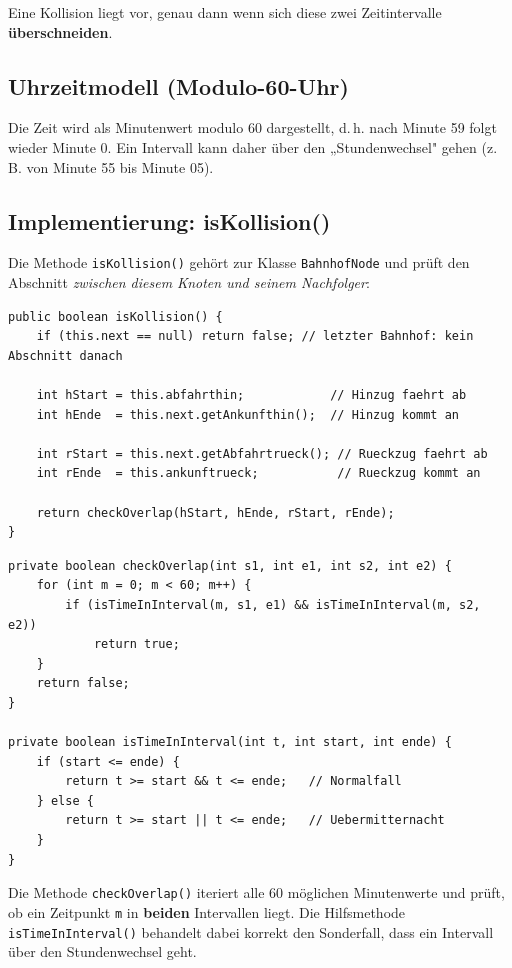 \documentclass[12pt,a4paper]{article}
\begin{document}
Eine Kollision liegt vor, genau dann wenn sich diese zwei Zeitintervalle \textbf{überschneiden}.

\subsection{Uhrzeitmodell (Modulo-60-Uhr)}

Die Zeit wird als Minutenwert modulo 60 dargestellt, d.\,h. nach Minute 59 folgt wieder Minute 0. Ein Intervall kann daher über den „Stundenwechsel" gehen (z.\,B. von Minute 55 bis Minute 05).

\subsection{Implementierung: isKollision()}

Die Methode \texttt{isKollision()} gehört zur Klasse \texttt{BahnhofNode} und prüft den Abschnitt \emph{zwischen diesem Knoten und seinem Nachfolger}:

\begin{lstlisting}[caption={BahnhofNode.isKollision()}]
public boolean isKollision() {
    if (this.next == null) return false; // letzter Bahnhof: kein Abschnitt danach

    int hStart = this.abfahrthin;            // Hinzug faehrt ab
    int hEnde  = this.next.getAnkunfthin();  // Hinzug kommt an

    int rStart = this.next.getAbfahrtrueck(); // Rueckzug faehrt ab
    int rEnde  = this.ankunftrueck;           // Rueckzug kommt an

    return checkOverlap(hStart, hEnde, rStart, rEnde);
}
\end{lstlisting}

\begin{lstlisting}[caption={Intervall-Überschneidungsprüfung}]
private boolean checkOverlap(int s1, int e1, int s2, int e2) {
    for (int m = 0; m < 60; m++) {
        if (isTimeInInterval(m, s1, e1) && isTimeInInterval(m, s2, e2))
            return true;
    }
    return false;
}

private boolean isTimeInInterval(int t, int start, int ende) {
    if (start <= ende) {
        return t >= start && t <= ende;   // Normalfall
    } else {
        return t >= start || t <= ende;   // Uebermitternacht
    }
}
\end{lstlisting}

Die Methode \texttt{checkOverlap()} iteriert alle 60 möglichen Minutenwerte und prüft, ob ein Zeitpunkt \texttt{m} in \textbf{beiden} Intervallen liegt. Die Hilfsmethode \texttt{isTimeInInterval()} behandelt dabei korrekt den Sonderfall, dass ein Intervall über den Stundenwechsel geht.
\end{document}
